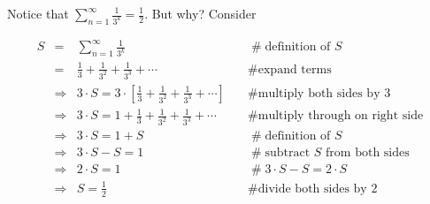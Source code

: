 \documentclass[11pt, oneside]{article}   	%
\begin{document}
Notice that  $\sum\limits_{n = 1}^\infty   \frac{1}{3^k}  = \frac{1}{2}$. But why? Consider 
      
\begin{equation*}
\begin{array}{lllll}
S
&=&   \sum\limits_{n = 1}^\infty   \frac{1}{3^k}                                                                     &\quad  \mathrel{\#} \text{definition of $S$}                    \\ 
&=& \frac{1}{3} + \frac{1}{3^2} + \frac{1}{3^3} + \cdots                                                       &\quad  \mathrel{\#} \text{expand terms}                         \\
&\Rightarrow& 3 \cdot S = 3 \cdot [\frac{1}{3} + \frac{1}{3^2} + \frac{1}{3^3} + \cdots ]      &\quad  \mathrel{\#} \text{multiply both sides by 3}         \\
&\Rightarrow& 3 \cdot S = 1 + \frac{1}{3} + \frac{1}{3^2} + \frac{1}{3^3} + \cdots               &\quad  \mathrel{\#} \text{multiply through on right side} \\
&\Rightarrow& 3 \cdot S = 1 + S                                                                                         &\quad  \mathrel{\#} \text{definition of $S$}                      \\
&\Rightarrow& 3 \cdot S - S = 1                                                                                          &\quad  \mathrel{\#} \text{subtract $S$ from both sides}  \\
&\Rightarrow& 2 \cdot S  = 1                                                                                               &\quad  \mathrel{\#} 3 \cdot S - S = 2 \cdot S                   \\
&\Rightarrow& S  = \frac{1}{2}                                                                                             &\quad  \mathrel{\#} \text{divide both sides by 2} 
\end{array}
\end{equation*}
\end{document}
